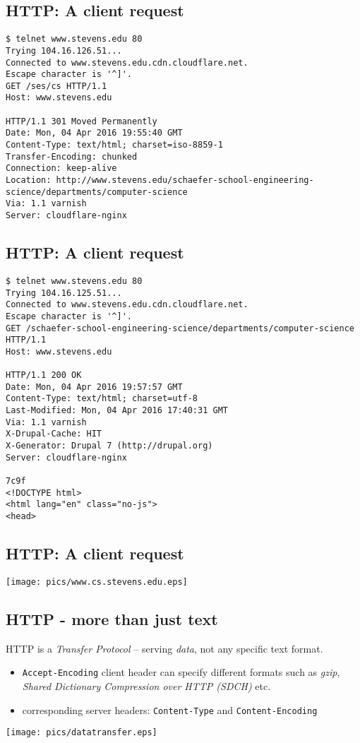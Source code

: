 \documentclass[xga]{xdvislides}
\begin{document}
\subsection{HTTP: A client request}
\smallish
\begin{verbatim}
$ telnet www.stevens.edu 80
Trying 104.16.126.51...
Connected to www.stevens.edu.cdn.cloudflare.net.
Escape character is '^]'.
GET /ses/cs HTTP/1.1
Host: www.stevens.edu

HTTP/1.1 301 Moved Permanently
Date: Mon, 04 Apr 2016 19:55:40 GMT
Content-Type: text/html; charset=iso-8859-1
Transfer-Encoding: chunked
Connection: keep-alive
Location: http://www.stevens.edu/schaefer-school-engineering-science/departments/computer-science
Via: 1.1 varnish
Server: cloudflare-nginx
\end{verbatim}
\Normalsize

\subsection{HTTP: A client request}
\smallish
\begin{verbatim}
$ telnet www.stevens.edu 80
Trying 104.16.125.51...
Connected to www.stevens.edu.cdn.cloudflare.net.
Escape character is '^]'.
GET /schaefer-school-engineering-science/departments/computer-science HTTP/1.1
Host: www.stevens.edu

HTTP/1.1 200 OK
Date: Mon, 04 Apr 2016 19:57:57 GMT
Content-Type: text/html; charset=utf-8
Last-Modified: Mon, 04 Apr 2016 17:40:31 GMT
Via: 1.1 varnish
X-Drupal-Cache: HIT
X-Generator: Drupal 7 (http://drupal.org)
Server: cloudflare-nginx

7c9f
<!DOCTYPE html>
<html lang="en" class="no-js">
<head>
\end{verbatim}
\Normalsize

\subsection{HTTP: A client request}
\begin{center}
	\texttt{[image: pics/www.cs.stevens.edu.eps]}
\end{center}


\subsection{HTTP - more than just text}
HTTP is a {\em Transfer Protocol} -- serving {\em data}, not any specific
text format.

\begin{itemize}
	\item {\tt Accept-Encoding} client header can specify different formats
		such as {\em gzip}, {\em Shared Dictionary Compression over HTTP (SDCH)} etc.
	\item corresponding server headers: {\tt Content-Type} and
		{\tt Content-Encoding}
\end{itemize}
\begin{center}
	\texttt{[image: pics/datatransfer.eps]}
\end{center}
\end{document}
